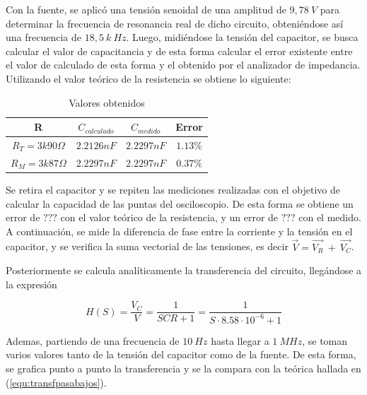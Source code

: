 \documentclass[a4paper]{article}
\begin{document}
 


Con la fuente, se aplicó una tensión senoidal de una amplitud de $9,78 \ V$ para determinar la frecuencia de resonancia real de dicho circuito, obteniéndose así una frecuencia de $18,5 \ k\ Hz$. Luego, midiéndose la tensión del capacitor, se busca calcular el valor de capacitancia y de esta forma calcular el error existente entre el valor de calculado de esta forma y el obtenido por el analizador de impedancia. Utilizando el valor teórico de la resistencia se obtiene lo siguiente:
 \begin{center}
     \begin{table}[H]
     \centering

     \label{table:valores_calculados}
         \begin{tabular}{|c|c|c|c|}
            \hline 
              R &  $C_{calculado}$ &    $C_{medido}$   &  Error\\
            \hline 
            $R_T = 3k90\Omega$  & $2.2126nF$ & $2.2297nF$ & $1.13\%$ \\ \hline  
            $R_M = 3k87\Omega$ & $2.2297nF$ & $2.2297nF$ & $0.37 \%$ \\   \hline
        \end{tabular}
        \caption{Valores obtenidos}
    \end{table}
\end{center}

Se retira el capacitor y se repiten las mediciones realizadas con el objetivo de calcular la capacidad de las puntas del osciloscopio. De esta forma se obtiene un error de $ ???  $ con el valor teórico de la resistencia, y un error de $  ???  $ con el medido.
A continuación, se mide la diferencia de fase entre la corriente y la tensión en el capacitor, y se verifica la suma vectorial de las tensiones, es decir $ \overrightarrow{V} = \overrightarrow{V_R} \ + \ \overrightarrow{V_C} $.



Posteriormente se calcula analíticamente la transferencia del circuito, llegándose a la expresión

\begin{equation}
	H \left(S \right) = \frac{V_C}{V} = \frac{1}{SCR + 1} = \frac{1}{S \cdot 8.58 \cdot 10^{-6} + 1}
	\label{equ:transfpasabajos}
\end{equation}

Ademas, partiendo de una frecuencia de $ 10 \ Hz $ hasta llegar a $ 1 \ MHz $, se toman varios valores tanto de la tensión del capacitor como de la fuente. De esta forma, se grafica punto a punto la transferencia y se la compara con la teórica hallada en (\ref{equ:transfpasabajos}).
\end{document}
